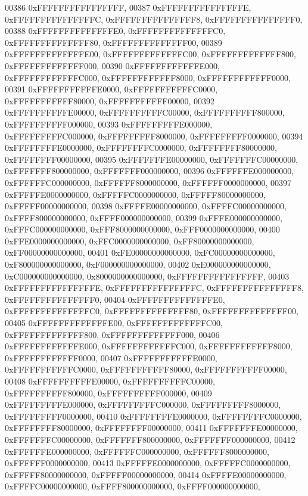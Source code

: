 \begin{DoxyCode}
00386         0xFFFFFFFFFFFFFFFF,
00387         0xFFFFFFFFFFFFFFFE, 0xFFFFFFFFFFFFFFFC, 0xFFFFFFFFFFFFFFF8, 0xFFFFFFFFFFFFFFF0,
00388         0xFFFFFFFFFFFFFFE0, 0xFFFFFFFFFFFFFFC0, 0xFFFFFFFFFFFFFF80, 0xFFFFFFFFFFFFFF00,
00389         0xFFFFFFFFFFFFFE00, 0xFFFFFFFFFFFFFC00, 0xFFFFFFFFFFFFF800, 0xFFFFFFFFFFFFF000,
00390         0xFFFFFFFFFFFFE000, 0xFFFFFFFFFFFFC000, 0xFFFFFFFFFFFF8000, 0xFFFFFFFFFFFF0000,
00391         0xFFFFFFFFFFFE0000, 0xFFFFFFFFFFFC0000, 0xFFFFFFFFFFF80000, 0xFFFFFFFFFFF00000,
00392         0xFFFFFFFFFFE00000, 0xFFFFFFFFFFC00000, 0xFFFFFFFFFF800000, 0xFFFFFFFFFF000000,
00393         0xFFFFFFFFFE000000, 0xFFFFFFFFFC000000, 0xFFFFFFFFF8000000, 0xFFFFFFFFF0000000,
00394         0xFFFFFFFFE0000000, 0xFFFFFFFFC0000000, 0xFFFFFFFF80000000, 0xFFFFFFFF00000000,
00395         0xFFFFFFFE00000000, 0xFFFFFFFC00000000, 0xFFFFFFF800000000, 0xFFFFFFF000000000,
00396         0xFFFFFFE000000000, 0xFFFFFFC000000000, 0xFFFFFF8000000000, 0xFFFFFF0000000000,
00397         0xFFFFFE0000000000, 0xFFFFFC0000000000, 0xFFFFF80000000000, 0xFFFFF00000000000,
00398         0xFFFFE00000000000, 0xFFFFC00000000000, 0xFFFF800000000000, 0xFFFF000000000000,
00399         0xFFFE000000000000, 0xFFFC000000000000, 0xFFF8000000000000, 0xFFF0000000000000,
00400         0xFFE0000000000000, 0xFFC0000000000000, 0xFF80000000000000, 0xFF00000000000000,
00401         0xFE00000000000000, 0xFC00000000000000, 0xF800000000000000, 0xF000000000000000,
00402         0xE000000000000000, 0xC000000000000000, 0x8000000000000000, 0xFFFFFFFFFFFFFFFF,
00403         0xFFFFFFFFFFFFFFFE, 0xFFFFFFFFFFFFFFFC, 0xFFFFFFFFFFFFFFF8, 0xFFFFFFFFFFFFFFF0,
00404         0xFFFFFFFFFFFFFFE0, 0xFFFFFFFFFFFFFFC0, 0xFFFFFFFFFFFFFF80, 0xFFFFFFFFFFFFFF00,
00405         0xFFFFFFFFFFFFFE00, 0xFFFFFFFFFFFFFC00, 0xFFFFFFFFFFFFF800, 0xFFFFFFFFFFFFF000,
00406         0xFFFFFFFFFFFFE000, 0xFFFFFFFFFFFFC000, 0xFFFFFFFFFFFF8000, 0xFFFFFFFFFFFF0000,
00407         0xFFFFFFFFFFFE0000, 0xFFFFFFFFFFFC0000, 0xFFFFFFFFFFF80000, 0xFFFFFFFFFFF00000,
00408         0xFFFFFFFFFFE00000, 0xFFFFFFFFFFC00000, 0xFFFFFFFFFF800000, 0xFFFFFFFFFF000000,
00409         0xFFFFFFFFFE000000, 0xFFFFFFFFFC000000, 0xFFFFFFFFF8000000, 0xFFFFFFFFF0000000,
00410         0xFFFFFFFFE0000000, 0xFFFFFFFFC0000000, 0xFFFFFFFF80000000, 0xFFFFFFFF00000000,
00411         0xFFFFFFFE00000000, 0xFFFFFFFC00000000, 0xFFFFFFF800000000, 0xFFFFFFF000000000,
00412         0xFFFFFFE000000000, 0xFFFFFFC000000000, 0xFFFFFF8000000000, 0xFFFFFF0000000000,
00413         0xFFFFFE0000000000, 0xFFFFFC0000000000, 0xFFFFF80000000000, 0xFFFFF00000000000,
00414         0xFFFFE00000000000, 0xFFFFC00000000000, 0xFFFF800000000000, 0xFFFF000000000000,

\end{DoxyCode}
